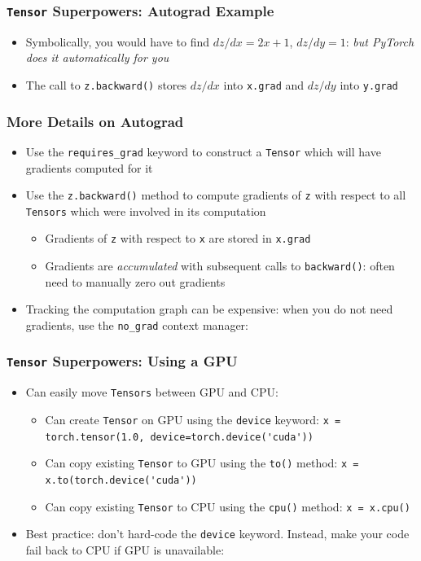 \documentclass[xcolor={x11names,table}]{beamer}
\begin{document}
\begin{frame}
	\frametitle{\lstinline!Tensor! Superpowers: Autograd Example}
	
	
	\begin{itemize}
		\item Symbolically, you would have to find $dz/dx=2x+1$, $dz/dy=1$: \emph{but PyTorch does it automatically for you}
		\item The call to \lstinline!z.backward()! stores $dz/dx$ into \lstinline!x.grad! and $dz/dy$ into \lstinline!y.grad!
	\end{itemize}
\end{frame}


\begin{frame}
	\frametitle{More Details on Autograd}
	\begin{itemize}
		\item Use the \lstinline!requires_grad! keyword to construct a \lstinline!Tensor! which will have gradients computed for it
		\item Use the \lstinline!z.backward()! method to compute gradients of \lstinline!z! with respect to all \lstinline!Tensors! which were involved in its computation
		\begin{itemize}
			\item Gradients of \lstinline!z! with respect to \lstinline!x! are stored in \lstinline!x.grad!
			\item Gradients are \emph{accumulated} with subsequent calls to \lstinline!backward()!: often need to manually zero out gradients
		\end{itemize}
		\item Tracking the computation graph can be expensive: when you do not need gradients, use the \lstinline!no_grad! context manager:
		
	\end{itemize}
\end{frame}

\begin{frame}
	\frametitle{\lstinline!Tensor! Superpowers: Using a GPU}
	\begin{itemize}
		\item Can easily move \lstinline!Tensors! between GPU and CPU:
		\begin{itemize}
			\item Can create \lstinline!Tensor! on GPU using the \lstinline!device! keyword: \lstinline!x = torch.tensor(1.0, device=torch.device('cuda'))!
			\item Can copy existing \lstinline!Tensor! to GPU using the \lstinline!to()! method: \lstinline!x = x.to(torch.device('cuda'))!
			\item Can copy existing \lstinline!Tensor! to CPU using the \lstinline!cpu()! method: \lstinline!x = x.cpu()!
		\end{itemize}
		\item Best practice: don't hard-code the \lstinline!device! keyword. Instead, make your code fail back to CPU if GPU is unavailable:
		
	\end{itemize}
\end{frame}
\end{document}

